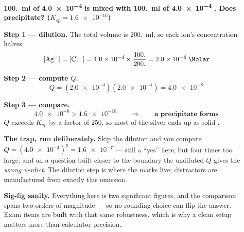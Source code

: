 \documentclass{apchem-worksheet}
\begin{document}
\begin{center}
\end{center}

\begin{workedexample}
\textbf{\SI{100.}{\milli\litre} of \SI{4.0e-4}{\Molar}  is
mixed with \SI{100.}{\milli\litre} of \SI{4.0e-4}{\Molar} .
Does  precipitate? ($K_{sp} = \num{1.6e-10}$)}

\textbf{Step 1 --- dilution.} The total volume is
\SI{200.}{\milli\litre}, so each ion's concentration halves:
\[ [\ce{Ag+}] = [\ce{Cl-}]
   = \num{4.0e-4} \times \frac{100.}{200.}
   = \num{2.0e-4}\;\si{\Molar} \]

\textbf{Step 2 --- compute $Q$.}
\[ Q = (\num{2.0e-4})(\num{2.0e-4}) = \num{4.0e-8} \]

\textbf{Step 3 --- compare.}
\[ \num{4.0e-8} > \num{1.6e-10}
   \qquad\Longrightarrow\qquad
   \textbf{a precipitate forms} \]
$Q$ exceeds $K_{sp}$ by a factor of 250, so most of the silver ends up
as solid .

\textbf{The trap, run deliberately.} Skip the dilution and you compute
$Q = (\num{4.0e-4})^{2} = \num{1.6e-7}$ --- still a ``yes'' here, but
four times too large, and on a question built closer to the boundary
the undiluted $Q$ gives the \emph{wrong verdict}. The dilution step is
where the marks live; distractors are manufactured from exactly this
omission.

\textbf{Sig-fig sanity.} Everything here is two significant figures,
and the comparison spans two orders of magnitude --- so no rounding
choice can flip the answer. Exam items are built with that same
robustness, which is why a clean setup matters more than calculator
precision.
\end{workedexample}
\end{document}
